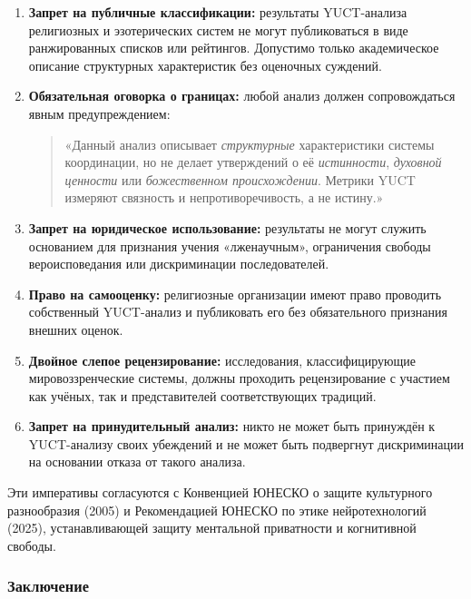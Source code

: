 \documentclass[12pt,a4paper]{article}
\begin{document}
	\begin{enumerate}[label=(\arabic*)]
		\item \textbf{Запрет на публичные классификации:} результаты YUCT-анализа религиозных и эзотерических систем не могут публиковаться в виде ранжированных списков или рейтингов. Допустимо только академическое описание структурных характеристик без оценочных суждений.
		
		\item \textbf{Обязательная оговорка о границах:} любой анализ должен сопровождаться явным предупреждением:
		\begin{quote}
			«Данный анализ описывает \emph{структурные} характеристики системы координации, но не делает утверждений о её \emph{истинности}, \emph{духовной ценности} или \emph{божественном происхождении}. Метрики YUCT измеряют связность и непротиворечивость, а не истину.»
		\end{quote}
		
		\item \textbf{Запрет на юридическое использование:} результаты не могут служить основанием для признания учения «лженаучным», ограничения свободы вероисповедания или дискриминации последователей.
		
		\item \textbf{Право на самооценку:} религиозные организации имеют право проводить собственный YUCT-анализ и публиковать его без обязательного признания внешних оценок.
		
		\item \textbf{Двойное слепое рецензирование:} исследования, классифицирующие мировоззренческие системы, должны проходить рецензирование с участием как учёных, так и представителей соответствующих традиций.
		
		\item \textbf{Запрет на принудительный анализ:} никто не может быть принуждён к YUCT-анализу своих убеждений и не может быть подвергнут дискриминации на основании отказа от такого анализа.
	\end{enumerate}
	
	Эти императивы согласуются с Конвенцией ЮНЕСКО о защите культурного разнообразия (2005) и Рекомендацией ЮНЕСКО по этике нейротехнологий (2025), устанавливающей защиту ментальной приватности и когнитивной свободы.
	
	\subsubsection{Заключение}
	
\end{document}
